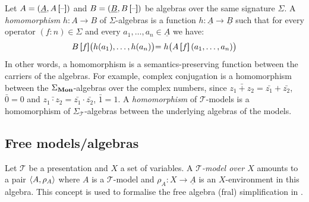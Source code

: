 Let $A = (\underline{A}, A \left[\!\!\!\:\left[ \text{--} \right]\!\!\!\:\right])$ and $B = (\underline{B}, B \left[\!\!\!\:\left[ \text{--} \right]\!\!\!\:\right])$ be algebras over the same signature $\Sigma$. A \emph{homomorphism} $h : A \to B$ of $\Sigma$-algebras is a function $h : \underline{A} \to \underline{B}$ such that for every operator $(f : n) \in \Sigma$ and every $a_1, \ldots, a_n \in \underline{A}$ we have:
$$B \brak{f}\bigr(h(a_1), \ldots, h(a_n)\bigl) = h\bigr(A \brak{f}(a_1, \ldots, a_n)\bigl)$$
In other words, a homomorphism is a semantics-preserving function between the carriers of the algebras. For example, complex conjugation is a homomorphism between the $\Sigma_{\mathbf{Mon}}$-algebras over the complex numbers, since $\bar{z_1 + z_2} = \bar{z_1} + \bar{z_2}$, $\bar{0} = 0$ and $\bar{z_1 \cdot z_2} = \bar{z_1} \cdot \bar{z_2}$, $\bar{1} = 1$. A \emph{homomorphism} of $\mathcal T$-models is a homomorphism of $\Sigma_{\mathcal T}$-algebras between the underlying algebras of the models. 

\subsection{Free models/algebras}
\label{sec:free_algebras}

Let $\mathcal T$ be a presentation and $X$ a set of variables. A \emph{$\mathcal{T}$-model over $X$} amounts to a pair $\left\langle A, \rho_A \right\rangle$ where $A$ is a $\mathcal{T}$-model and $\rho_A : X \to \underline{A}$ is an $X$-environment in this algebra. This concept is used to formalise the free algebra (fral) simplification in .

